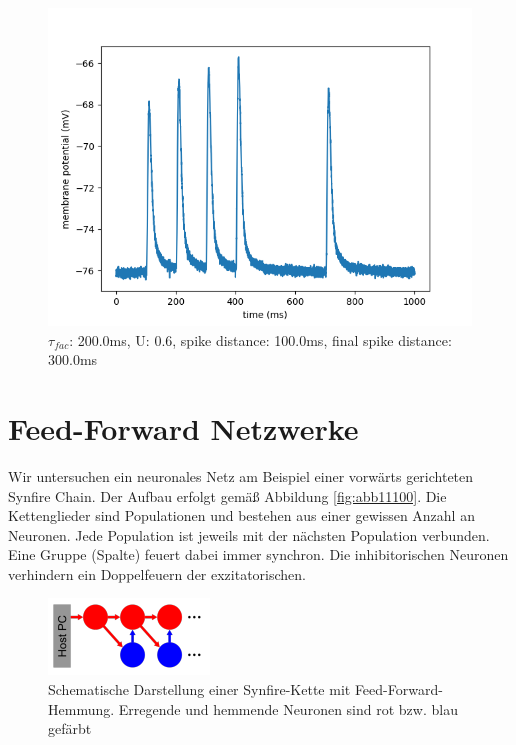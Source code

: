 \documentclass[10pt,a4paper]{scrartcl}
\begin{document}
\begin{figure} [ht]
\begin{center}
\label{fig:abb31}
\caption{$\tau_{fac}$: 200.0ms, U: 0.6, spike distance: 100.0ms, final spike distance: 300.0ms}
\includegraphics[scale=0.35]{pictures/final_spike_variation_20.pdf} 
\end{center}
\end{figure}


\newpage


\section{Feed-Forward Netzwerke}
Wir untersuchen ein neuronales Netz am Beispiel einer vorwärts gerichteten Synfire Chain. Der Aufbau erfolgt gemäß Abbildung \ref{fig:abb11100}. Die Kettenglieder sind Populationen und bestehen aus einer gewissen Anzahl an Neuronen. Jede Population ist jeweils mit der nächsten Population verbunden. Eine Gruppe (Spalte) feuert dabei immer synchron. Die inhibitorischen Neuronen verhindern ein Doppelfeuern der exzitatorischen. 

\begin{figure} [ht]
\begin{center}
\label{fig:abb32}
\caption{Schematische Darstellung einer Synfire-Kette mit Feed-Forward-Hemmung. Erregende und hemmende Neuronen sind rot bzw. blau gefärbt}
\includegraphics[scale=0.8]{pictures/synfire_chain.png}
\end{center}
\end{figure}
\end{document}
